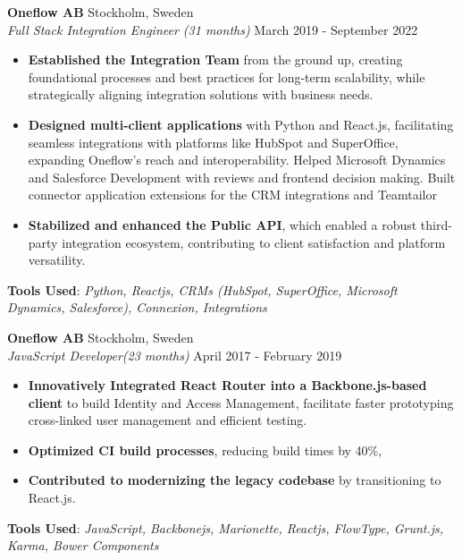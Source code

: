 \begin{minipage}[t]{0.61\textwidth}
\raggedright
\setlength{\parskip}{1ex}%

\vspace{1ex}

\Large
{}
\vspace{0.5em}
\Large
\noindent
\textbf{Oneflow AB} \hfill Stockholm, Sweden\\
\textit{Full Stack Integration Engineer (31 months)} \hfill March 2019 - September 2022
\begin{itemize}
\setlength{\itemsep}{0.5em}
    \item \textbf{Established the Integration Team} from the ground up, creating foundational processes and best practices for long-term scalability, while strategically aligning integration solutions with business needs.
    \item \textbf{Designed multi-client applications} with Python and React.js, facilitating seamless integrations with platforms like HubSpot and SuperOffice, expanding Oneflow’s reach and interoperability.
    Helped Microsoft Dynamics and Salesforce Development with reviews and frontend decision making.
    Built connector application extensions for the CRM integrations and Teamtailor
    \item \textbf{Stabilized and enhanced the Public API}, which enabled a robust third-party integration ecosystem, contributing to client satisfaction and platform versatility.
\end{itemize}
\vspace{0.2em}
\textbf{Tools Used}: \textit{Python, Reactjs, CRMs (HubSpot, SuperOffice, Microsoft Dynamics, Salesforce), Connexion, Integrations}

\vspace{1em}

\noindent
\textbf{Oneflow AB} \hfill Stockholm, Sweden\\
\textit{JavaScript Developer(23 months)} \hfill April 2017 - February 2019
\begin{itemize}
\setlength{\itemsep}{0.5em}
    \item \textbf{Innovatively Integrated React Router into a Backbone.js-based client} to build Identity and Access Management, facilitate faster prototyping cross-linked user management and efficient testing.
    \item \textbf{Optimized CI build processes}, reducing build times by 40\%,
    \item \textbf{Contributed to modernizing the legacy codebase} by transitioning to React.js.
\end{itemize}
\vspace{0.2em}
\textbf{ Tools Used}: \textit{JavaScript, Backbonejs, Marionette, Reactjs, FlowType, Grunt.js, Karma, Bower Components}


\end{minipage}
